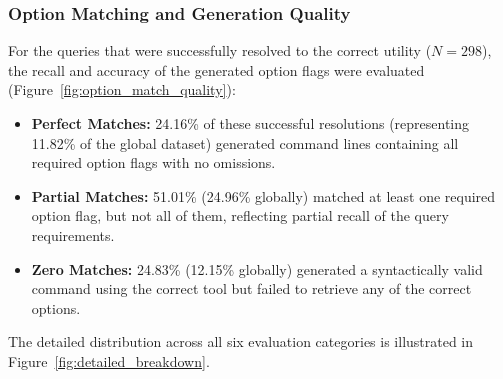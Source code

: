 \subsubsection{Option Matching and Generation Quality}
For the queries that were successfully resolved to the correct utility ($N=298$), the recall and accuracy of the generated option flags were evaluated (Figure~\ref{fig:option_match_quality}):
\begin{itemize}
    \item \textbf{Perfect Matches:} 24.16\% of these successful resolutions (representing 11.82\% of the global dataset) generated command lines containing all required option flags with no omissions.
    \item \textbf{Partial Matches:} 51.01\% (24.96\% globally) matched at least one required option flag, but not all of them, reflecting partial recall of the query requirements.
    \item \textbf{Zero Matches:} 24.83\% (12.15\% globally) generated a syntactically valid command using the correct tool but failed to retrieve any of the correct options.
\end{itemize}
The detailed distribution across all six evaluation categories is illustrated in Figure~\ref{fig:detailed_breakdown}.

